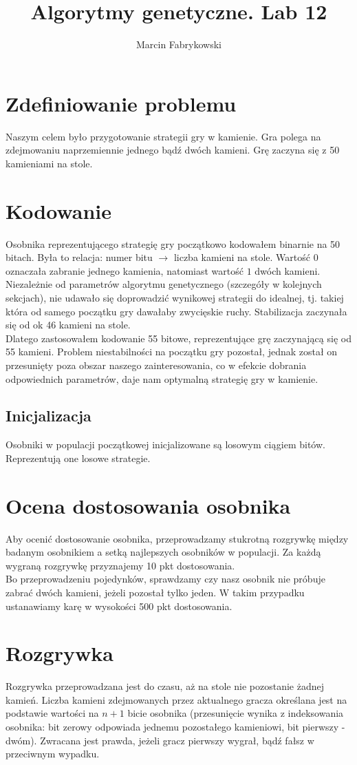 \documentclass[a4paper,12pkt]{article}
\author{Marcin Fabrykowski}
\title{Algorytmy genetyczne. Lab 12}
\begin{document}
\maketitle
\newpage
\section{Zdefiniowanie problemu}
Naszym celem było przygotowanie strategii gry w kamienie. Gra polega na zdejmowaniu naprzemiennie jednego bądź dwóch kamieni. Grę zaczyna się z 50 kamieniami na stole.
\section{Kodowanie}
Osobnika reprezentującego strategię gry początkowo kodowałem binarnie na 50 bitach. Była to relacja: numer bitu $\rightarrow$ liczba kamieni na stole. Wartość $0$ oznaczała zabranie jednego kamienia, natomiast wartość $1$ dwóch kamieni.\\
Niezależnie od parametrów algorytmu genetycznego (szczegóły w kolejnych sekcjach), nie udawało się doprowadzić wynikowej strategii do idealnej, tj. takiej która od samego początku gry dawałaby zwycięskie ruchy. Stabilizacja zaczynała się od ok 46 kamieni na stole.\\
Dlatego zastosowałem kodowanie 55 bitowe, reprezentujące grę zaczynającą się od 55 kamieni. Problem niestabilności na początku gry pozostał, jednak został on przesunięty poza obszar naszego zainteresowania, co w efekcie dobrania odpowiednich parametrów, daje nam optymalną strategię gry w kamienie.
\subsection{Inicjalizacja}
Osobniki w populacji początkowej inicjalizowane są losowym ciągiem bitów. Reprezentują one losowe strategie.
\section{Ocena dostosowania osobnika}
Aby ocenić dostosowanie osobnika, przeprowadzamy stukrotną rozgrywkę między badanym osobnikiem a setką najlepszych osobników w populacji. Za każdą wygraną rozgrywkę przyznajemy 10 pkt dostosowania.\\
Bo przeprowadzeniu pojedynków, sprawdzamy czy nasz osobnik nie próbuje zabrać dwóch kamieni, jeżeli pozostał tylko jeden. W takim przypadku ustanawiamy karę w wysokości 500 pkt dostosowania.
\section{Rozgrywka}
Rozgrywka przeprowadzana jest do czasu, aż na stole nie pozostanie żadnej kamień. Liczba kamieni zdejmowanych przez aktualnego gracza określana jest na podstawie wartości na $n+1$ bicie osobnika (przesunięcie wynika z indeksowania osobnika: bit zerowy odpowiada jednemu pozostałego kamieniowi, bit pierwszy - dwóm). Zwracana jest prawda, jeżeli gracz pierwszy wygrał, bądź fałsz w przeciwnym wypadku.
\end{document}
